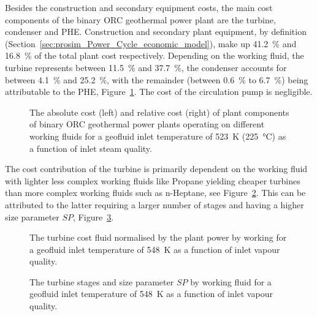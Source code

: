     Besides the construction and secondary equipment costs, the main cost components of the binary \ac{ORC} geothermal power plant are the turbine, condenser and \ac{PHE}. Construction and secondary plant equipment, by definition (Section~\ref{sec:prosim_Power_Cycle_economic_model}), make up \qty{41.2}{\percent} and \qty{16.8}{\percent} of the total plant cost respectively. Depending on the working fluid, the turbine represents between \qty{11.5}{\percent} and \qty{37.7}{\percent}, the condenser accounts for between \qty{4.1}{\percent} and \qty{25.2}{\percent}, with the remainder (between \qty{0.6}{\percent} to \qty{6.7}{\percent}) being attributable to the \ac{PHE}, Figure~\ref{fig:prosim_purewater_ORC_Costbreakdown}. The cost of the circulation pump is negligible.

    \begin{figure}[H]
        \centering
        
        \caption[The absolute cost and relative cost of plant components of a binary \ac{ORC} geothermal power plant by working fluids.]{The absolute cost (left) and relative cost (right) of plant components of binary \ac{ORC} geothermal power plants operating on different working fluids for a geofluid inlet temperature of \qty{523}{\K} (\qty{225}{\degreeCelsius}) as a function of inlet steam quality.}
        \label{fig:prosim_purewater_ORC_Costbreakdown}
    \end{figure}

    The cost contribution of the turbine is primarily dependent on the working fluid with lighter less complex working fluids like Propane yielding cheaper turbines than more complex working fluids such as n-Heptane, see Figure~\ref{fig:prosim_purewater_spec_turb_cost}. This can be attributed to the latter requiring a larger number of stages and having a higher size parameter \(SP\), Figure~\ref{fig:prosim_purewater_turb_stages_SP}.

    \begin{figure}[H]
        \centering
        
        \caption{The turbine cost fluid normalised by the plant power by working for a geofluid inlet temperature of \qty{548}{\K} as a function of inlet vapour quality.}
        \label{fig:prosim_purewater_spec_turb_cost}
    \end{figure}

    \begin{figure}[H]
        \centering
        
        \caption{The turbine stages and size parameter \(SP\) by working fluid for a geofluid inlet temperature of \qty{548}{\K} as a function of inlet vapour quality.}
        \label{fig:prosim_purewater_turb_stages_SP}
    \end{figure}

